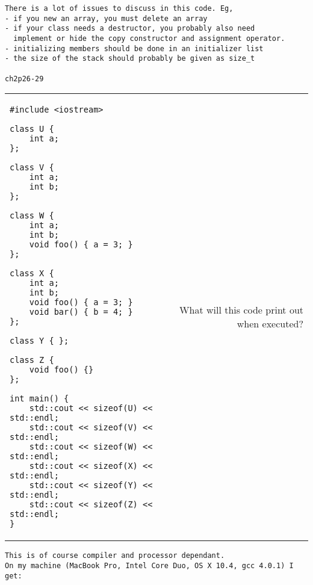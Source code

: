 \documentclass[landscape]{slides}
\begin{document}
\begin{slide}
\begin{note}
\begin{tiny}
\begin{verbatim}
There is a lot of issues to discuss in this code. Eg,
- if you new an array, you must delete an array
- if your class needs a destructor, you probably also need
  implement or hide the copy constructor and assignment operator.
- initializing members should be done in an initializer list
- the size of the stack should probably be given as size_t

ch2p26-29
\end{verbatim}
\end{tiny}
\end{note}  

\end{slide}


\begin{slide}

\begin{tabular*}{\textwidth}{@{\extracolsep{\fill}}lr}
\begin{minipage}[c]{.6\linewidth}
\begin{lstlisting}
#include <iostream>

class U {
    int a;
};

class V {
    int a;
    int b;
};

class W {
    int a;
    int b;
    void foo() { a = 3; }
};

class X {
    int a;
    int b;
    void foo() { a = 3; }
    void bar() { b = 4; }
};

class Y { };

class Z {
    void foo() {}
};

int main() {
    std::cout << sizeof(U) << std::endl;
    std::cout << sizeof(V) << std::endl;
    std::cout << sizeof(W) << std::endl;
    std::cout << sizeof(X) << std::endl;
    std::cout << sizeof(Y) << std::endl;
    std::cout << sizeof(Z) << std::endl;
}
\end{lstlisting}
\end{minipage}
&
\begin{minipage}{.3\linewidth}
What will this code print out when executed?
\end{minipage}
\end{tabular*}

\begin{note}
\begin{tiny}
\begin{verbatim}
This is of course compiler and processor dependant. 
On my machine (MacBook Pro, Intel Core Duo, OS X 10.4, gcc 4.0.1) I get:


\end{verbatim}
\end{tiny}
\end{note}
\end{slide}
\end{document}
